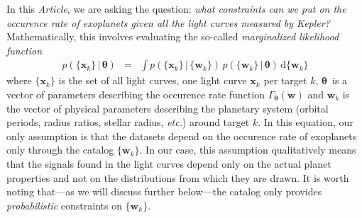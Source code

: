 \documentclass[12pt,preprint]{aastex}
\newcommand{\project}[1]{{\sffamily #1}}
\newcommand{\kepler}{\project{Kepler}}
\newcommand{\paper}{\textsl{Article}}
\newcommand{\foreign}[1]{\emph{#1}}
\newcommand{\etc}{\foreign{etc.}}
\newcommand{\eqlabel}[1]{\label{eq:#1}}
\newcommand{\dd}{\ensuremath{\,\mathrm{d}}}
\newcommand{\bvec}[1]{\ensuremath{\boldsymbol{#1}}}
\newcommand{\rate}{\ensuremath{\Gamma}}
\newcommand{\ratepar}{{\ensuremath{\theta}}}
\newcommand{\ratepars}{{\ensuremath{\bvec{\ratepar}}}}
\newcommand{\data}{{\ensuremath{\bvec{x}}}}
\newcommand{\entry}{{\ensuremath{\bvec{w}}}}
\begin{document}
In this \paper, we are asking the question: \emph{what constraints can we put
on the occurence rate of exoplanets given all the light curves measured by
\kepler?}
Mathematically, this involves evaluating the so-called \emph{marginalized
likelihood function}
\begin{eqnarray}\eqlabel{crazylike}
p(\{\data_k\}\,|\,\ratepars) &=&
    \int p(\{\data_k\}\,|\,\{\entry_k\})
    \,p(\{\entry_k\}\,|\,\ratepars)
    \dd\{\entry_k\}
\end{eqnarray}
where $\{\data_k\}$ is the set of all light curves, one light curve $\data_k$
per target $k$, \ratepars\ is a vector of parameters describing the occurence
rate function $\rate_\ratepars(\entry)$ and $\entry_k$ is the vector of
physical parameters describing the planetary system (orbital periods,
radius ratios, stellar radius, \etc) around target $k$.
In this equation, our only assumption is that the datasets depend on the
occurence rate of exoplanets only through the catalog $\{\entry_k\}$.
In our case, this assumption qualitatively means that the signals found in the
light curves depend only on the actual planet properties and not on the
distributions from which they are drawn.
It is worth noting that---as we will discuss further below---the catalog only
provides \emph{probabilistic} constraints on $\{\entry_k\}$.
\end{document}
